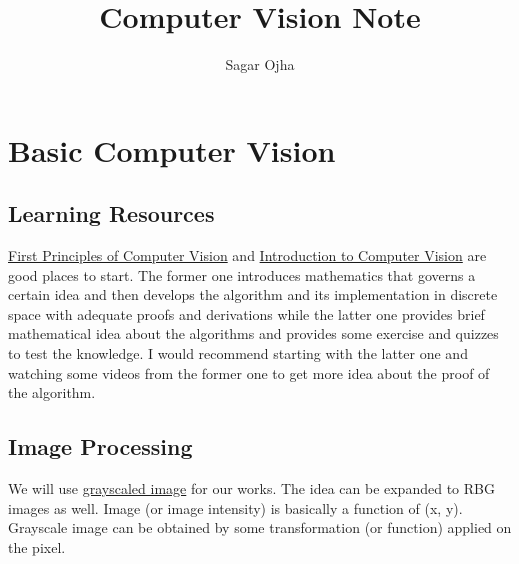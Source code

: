 \documentclass{report}
\title{\Large{Computer Vision Note}}
\author{Sagar Ojha}
\begin{document}
\maketitle
\pagebreak

\tableofcontents
\pagebreak
\chapter{Basic Computer Vision}

\section{Learning Resources}
\hspace{\parindent}\href{https://www.youtube.com/@firstprinciplesofcomputerv3258/playlists}{First Principles of Computer Vision} and \href{https://www.udacity.com/course/introduction-to-computer-vision--ud810?autoenroll=true}{Introduction to Computer Vision} are good places to start. The former one introduces mathematics that governs a certain idea and then develops the algorithm and its implementation in discrete space with adequate proofs and derivations while the latter one provides brief mathematical idea about the algorithms and provides some exercise and quizzes to test the knowledge. I would recommend starting with the latter one and watching some videos from the former one to get more idea about the proof of the algorithm.


\section{Image Processing}
\hspace{\parindent}We will use \href{https://en.wikipedia.org/wiki/Grayscale}{grayscaled image} for our works. The idea can be expanded to RBG images as well. Image (or image intensity) is basically a function of (x, y). Grayscale image can be obtained by some transformation (or function) applied on the pixel.
\end{document}
